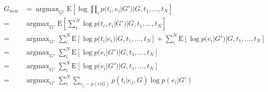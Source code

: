 \documentclass{article}
\DeclareMathOperator*{\argmax}{argmax}
\newcommand{\E}{\mathrm{E}}
\begin{document}
\begin{align}
G_{new} &= \argmax_{G'} 
     \E [\log \prod_i p(t_i, e_i | G') | G, t_1, \dots, t_N]\\
        =& \argmax_{G'} \E 
           [\sum_i^N \log p(t_i, e_i | G') | G, t_1, \dots, t_N]\\
  =& \argmax_{G'} \sum_i^N \E [\log p(t_i |  e_i) | G, t_1, \dots, t_N] + 
  \sum_i^N \E [\log p(e_i |  G') | G, t_1, \dots, t_N]\\
  =& \argmax_{G'}  
  \sum_i^N \E [\log p(e_i |  G') | G, t_1, \dots, t_N]\\
  =& \argmax_{G'} \sum_i^N \E [\log p(e_i |  G') | G, t_1, \dots, t_N]\\
  =& \argmax_{G'} \sum_i^N \sum_{e_j \sim p(e|G)}
                            p(t_i | e_j, G) 
                            \log p(e_i |  G')
\end{align}
\end{document}
